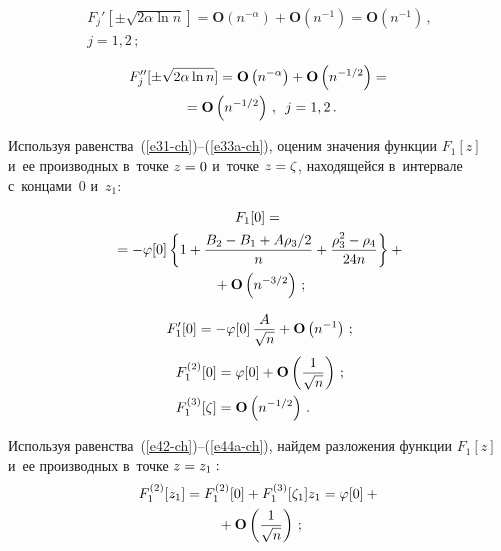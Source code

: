 \begin{multicols}{2}
  \vspace*{-12pt}
 
 \noindent
 \begin{multline}
F_j'[\pm\sqrt{2\alpha\ln n}]=\mathbf{O}\left(n^{-\alpha}\right)
  +\mathbf{O}\left(n^{-1}\right)=\mathbf{O}\left(n^{-1}\right)\,, \\ j=1,2\,;
 \label{e40-ch}
 \end{multline}
 
  \vspace*{-12pt}
 
 \noindent
 \begin{multline}
F_j''[\pm\sqrt{2\alpha\ln n}] =\mathbf{O}\left(n^{-\alpha}\right)
  +\mathbf{O}\left(n^{-1/2}\right)={}\\
  {}=\mathbf{O}\left(n^{-1/2}\right)\,,\enskip j=1,2\,.
 \label{e41-ch}
 \end{multline}

 Используя равенства~(\ref{e31-ch})--(\ref{e33a-ch}), 
 оценим значения функции $F_1[z]$ и~ее производных в~точке $z\hm=0$ 
 и~точке $z\hm=\zeta$, находящейся в~интервале с~концами~$0$ и~$z_{1}$:
 

 
 \noindent
 \begin{multline}
F_1[0]={}\\
{}=
  -\varphi[0]\left\{
  1+\displaystyle\frac{\displaystyle B_2-B_1+A\rho_3/2\mathstrut}{\displaystyle n\mathstrut}
  +\displaystyle\frac{\displaystyle \rho_3^2- \rho_4 \mathstrut}{\displaystyle 24n\mathstrut}
  \right\}+{}\\
  {}+\mathbf{O}\left(n^{-3/2}\right)\,;
 \label{e42-ch}
\end{multline}

\vspace*{-12pt}

\noindent
\begin{equation}
F_1'[0]= -\varphi[0]\,\displaystyle\frac{\displaystyle A\mathstrut}{\displaystyle \sqrt{n}\mathstrut}+\mathbf{O}\left(n^{-1}\right)\,;\label{e43-ch}
\end{equation}
\begin{align}
F_1^{(2)}[0]&=\varphi[0]+\mathbf{O}\left(\displaystyle\frac{\displaystyle 1\mathstrut}{\displaystyle \sqrt{n}\mathstrut}\right)\,; \label{e44-ch}\\
  F_1^{(3)}[\zeta]&=\mathbf{O}\left(n^{-1/2}\right)\,.
 \label{e44a-ch}
 \end{align}

 Используя равенства~(\ref{e42-ch})--(\ref{e44a-ch}), 
 найдем разложения функции $F_1[z]$ и~ее производных
 в~точке $z\hm=z_{1}:$
  \begin{multline}
 F_1^{(2)}[z_{1}]= F_1^{(2)}[0]+F_1^{(3)}[\zeta_1] z_{1}
 =\varphi[0]+{}\\
 {}+\mathbf{O}\left(\displaystyle\frac{\displaystyle 1\mathstrut}{\displaystyle \sqrt{n}\mathstrut}\right)\,;
 \label{e45-ch}
 \end{multline}
 

\end{multicols}
